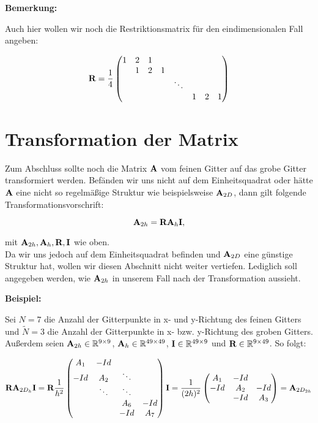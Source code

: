 \textbf{Bemerkung:}

Auch hier wollen wir noch die Restriktionsmatrix für den eindimensionalen Fall angeben:

\begin{equation}
{\textbf{R}} = \frac {1} {4}
\begin{pmatrix}
1 & 2 & 1\\
  & 1 & 2 & 1\\
  &   &   &   & \ddots\\
  &   &   &   &        & 1 & 2 & 1
\end{pmatrix}
\end{equation}

\section{Transformation der Matrix}

Zum Abschluss sollte noch die Matrix ${\textbf{A}}$ vom feinen Gitter auf das grobe Gitter transformiert werden. Befänden wir uns nicht auf dem Einheitsquadrat oder hätte ${\textbf{A}}$ eine nicht so regelmäßige Struktur wie beispielsweise ${\textbf{A}}_{2D}$, dann gilt folgende Transformationsvorschrift:

\begin{equation}
{\textbf{A}}_{2h} = {\textbf{R}}{\textbf{A}}_{h}{\textbf{I}},
\end{equation}

mit ${\textbf{A}}_{2h},{\textbf{A}}_{h},{\textbf{R}},{\textbf{I}}$ wie oben.\\
Da wir uns jedoch auf dem Einheitsquadrat befinden und ${\textbf{A}}_{2D}$ eine günstige Struktur hat, wollen wir diesen Abschnitt nicht weiter vertiefen. Lediglich soll angegeben werden, wie ${\textbf{A}}_{2h}$ in unserem Fall nach der Transformation aussieht.

\textbf{Beispiel:}

Sei $N = 7$ die Anzahl der Gitterpunkte in x- und y-Richtung des feinen Gitters und $\tilde N = 3$ die Anzahl der Gitterpunkte in x- bzw. y-Richtung des groben Gitters. Außerdem seien ${\textbf{A}}_{2h} \in \mathbb{R}^{9 \times 9}$, ${\textbf{A}}_{h} \in \mathbb{R}^{49 \times 49}$, ${\textbf{I}} \in \mathbb{R}^{49 \times 9}$ und ${\textbf{R}} \in \mathbb{R}^{9 \times 49}$. So folgt:

\begin{equation}
{\textbf{R}}{\textbf{A}}_{2D_{h}}{\textbf{I}} = {\textbf{R}} \frac{1}{h^{2}}
\begin{pmatrix}
A_{1} & -Id \\
-Id & A_{2} & \ddots \\
 & \ddots & \ddots \\
 & & A_{6} & -Id\\
 & & -Id & A_{7}
\end{pmatrix}
{\textbf{I}} = \frac{1}{(2h)^{2}}
\begin{pmatrix}
A_{1} & -Id \\
-Id & A_{2} & -Id \\
 & -Id & A_{3}
\end{pmatrix}
= {\textbf{A}}_{2D_{2h}}
\end{equation}

